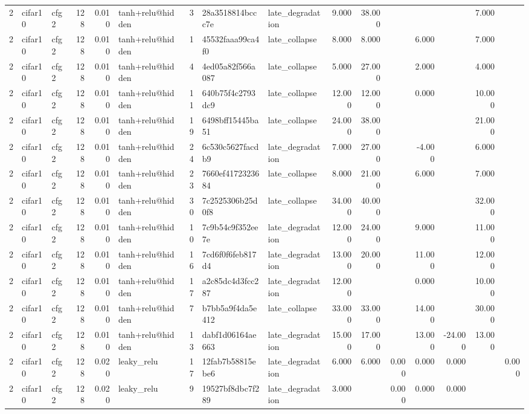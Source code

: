 \begin{table}[htbp]
{\begin{tabular}{@{}rllrrlrllrrrrrrr@{}}
2 & cifar10 & cfg2 & 128 & 0.010 & tanh+relu@hidden & 3 & 28a3518814bccc7e & late\_degradation & 9.000 & 38.000 &  &  &  & 7.000 &  \\
2 & cifar10 & cfg2 & 128 & 0.010 & tanh+relu@hidden & 1 & 45532faaa99ca4f0 & late\_collapse & 8.000 & 8.000 &  & 6.000 &  & 7.000 &  \\
2 & cifar10 & cfg2 & 128 & 0.010 & tanh+relu@hidden & 4 & 4ed05a82f566a087 & late\_collapse & 5.000 & 27.000 &  & 2.000 &  & 4.000 &  \\
2 & cifar10 & cfg2 & 128 & 0.010 & tanh+relu@hidden & 11 & 640b75f4c2793dc9 & late\_collapse & 12.000 & 12.000 &  & 0.000 &  & 10.000 &  \\
2 & cifar10 & cfg2 & 128 & 0.010 & tanh+relu@hidden & 19 & 6498bff15445ba51 & late\_collapse & 24.000 & 38.000 &  &  &  & 21.000 &  \\
2 & cifar10 & cfg2 & 128 & 0.010 & tanh+relu@hidden & 24 & 6c530c5627facdb9 & late\_degradation & 7.000 & 27.000 &  & -4.000 &  & 6.000 &  \\
2 & cifar10 & cfg2 & 128 & 0.010 & tanh+relu@hidden & 23 & 7660ef4172323684 & late\_collapse & 8.000 & 21.000 &  & 6.000 &  & 7.000 &  \\
2 & cifar10 & cfg2 & 128 & 0.010 & tanh+relu@hidden & 30 & 7c2525306b25d0f8 & late\_collapse & 34.000 & 40.000 &  &  &  & 32.000 &  \\
2 & cifar10 & cfg2 & 128 & 0.010 & tanh+relu@hidden & 10 & 7c9b54c9f352ee7e & late\_degradation & 12.000 & 24.000 &  & 9.000 &  & 11.000 &  \\
2 & cifar10 & cfg2 & 128 & 0.010 & tanh+relu@hidden & 16 & 7cd6f0f6feb817d4 & late\_degradation & 13.000 & 20.000 &  & 11.000 &  & 12.000 &  \\
2 & cifar10 & cfg2 & 128 & 0.010 & tanh+relu@hidden & 17 & a2c85dc4d3fcc287 & late\_degradation & 12.000 &  &  & 0.000 &  & 10.000 &  \\
2 & cifar10 & cfg2 & 128 & 0.010 & tanh+relu@hidden & 7 & b7bb5a9f4da5e412 & late\_collapse & 33.000 & 33.000 &  & 14.000 &  & 30.000 &  \\
2 & cifar10 & cfg2 & 128 & 0.010 & tanh+relu@hidden & 13 & dabf1d06164ae663 & late\_degradation & 15.000 & 17.000 &  & 13.000 & -24.000 & 13.000 &  \\
2 & cifar10 & cfg2 & 128 & 0.020 & leaky\_relu & 17 & 12fab7b58815ebe6 & late\_degradation & 6.000 & 6.000 & 0.000 & 0.000 & 0.000 &  & 0.000 \\
2 & cifar10 & cfg2 & 128 & 0.020 & leaky\_relu & 9 & 19527bf8dbc7f289 & late\_degradation & 3.000 &  & 0.000 & 0.000 & 0.000 &  &  \\

\end{tabular}}
\end{table}
